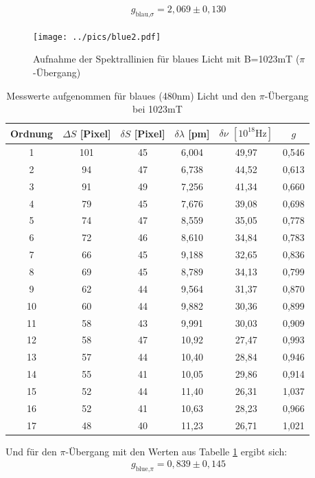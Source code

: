 \begin{align*}
g_{\text{blau,}\sigma}=2,069\pm0,130
\end{align*}
\begin{figure}[H]
\texttt{[image: ../pics/blue2.pdf]}
\caption{Aufnahme der Spektrallinien für blaues Licht mit B=1023mT ($\pi$-Übergang)}
\label{pic_blue1}
\end{figure}
\begin{table}[H]
    \begin{tabular}{|c|c|c|c|c|c|}
        Ordnung & $\Delta S$ [Pixel]    & $\delta S$ [Pixel]    &$\delta \lambda$ [pm]  & $\delta \nu$ $[10^{18}\text{Hz}]$ &   $g$\\\hline
        1&  101&   45&  6,004&  49,97&  0,546\\\hline
        2&  94& 47& 6,738&  44,52&  0,613\\\hline
        3&  91& 49& 7,256&  41,34&  0,660\\\hline
        4&  79& 45& 7,676&  39,08&  0,698\\\hline
        5&  74& 47& 8,559&  35,05&  0,778\\\hline
        6&  72& 46& 8,610&  34,84&  0,783\\\hline
        7&  66& 45& 9,188&  32,65&  0,836\\\hline
        8&  69& 45& 8,789&  34,13&  0,799\\\hline
        9&  62& 44& 9,564&  31,37&  0,870\\\hline
        10& 60& 44& 9,882&  30,36&  0,899\\\hline
        11& 58& 43& 9,991&  30,03&  0,909\\\hline
        12& 58& 47& 10,92&  27,47&  0,993\\\hline
        13& 57& 44& 10,40&  28,84&  0,946\\\hline
        14& 55& 41& 10,05&  29,86&  0,914\\\hline
        15& 52& 44& 11,40&  26,31&  1,037\\\hline
        16& 52& 41& 10,63&  28,23&  0,966\\\hline
        17& 48& 40& 11,23&  26,71&  1,021\\\hline
    \end{tabular}
    \caption{Messwerte aufgenommen für blaues (480nm) Licht und den $\pi$-Übergang bei 1023mT}
    \label{tab_blue_pi}
\end{table}

Und für den $\pi$-Übergang mit den Werten aus Tabelle \ref{tab_blue_pi} ergibt sich:
\begin{align*}
g_{\text{blue,}\pi}=0,839\pm0,145
\end{align*}

